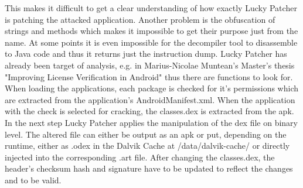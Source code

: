 This makes it difficult to get a clear understanding of how exactly Lucky Patcher is patching the attacked application.
Another problem is the obfuscation of strings and methods which makes it impossible to get their purpose just from the name.
At some points it is even impossible for the decompiler tool to disassemble to Java code and thus it returns just the instruction dump.
\newline
Lucky Patcher has already been target of analysis, e.g. in Marius-Nicolae Muntean's Master's thesis "Improving License Verification in Android" \cite{munteanLicense}
thus there are functions to look for.
When loading the applications, each package is checked for it's permissions which are extracted from the application's AndroidManifest.xml.
When the application with the check is selected for cracking, the classes.dex is extracted from the \gls{apk}.
In the next step Lucky Patcher applies the manipulation of the \gls{dex} file on binary level.
The altered file can either be output as an \gls{apk} or put, depending on the runtime, either as \gls{.odex} in the Dalvik Cache at /data/dalvik-cache/ or directly injected into the corresponding .art file.
After changing the classes.dex, the header's checksum hash and signature have to be updated to reflect the changes and to be valid.
\cite{munteanLicense}
%
